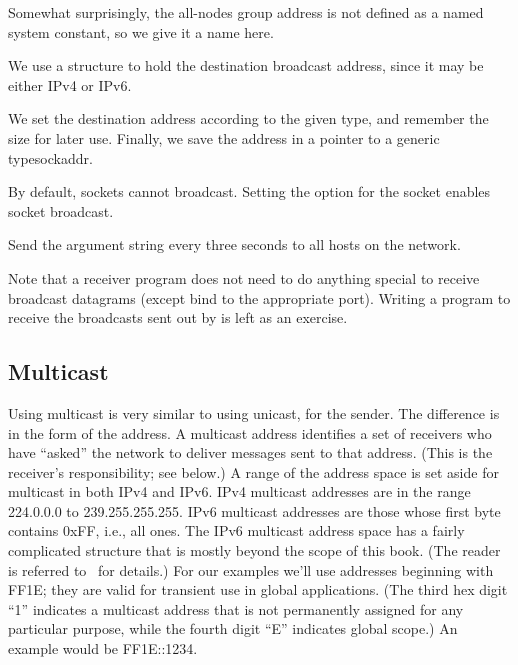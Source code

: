 \begin{topcode}


Somewhat surprisingly, the all-nodes group address is not defined as a
named system constant, so we give it a name here.



We use a  structure to hold the destination
broadcast address, since it may be either IPv4 or IPv6.


We set the destination address according to the given type, and
remember the size for later use.  Finally, we save the address in a
pointer to a generic type{sockaddr}.


By default, sockets cannot broadcast.  Setting the
 option
for the socket enables socket broadcast.

Send the argument string every three seconds to all hosts on the network.
\end{topcode}

Note that a receiver program does not need to do anything special to
receive broadcast datagrams (except bind to the appropriate port).
Writing a program to receive the broadcasts sent out by
 is left as an exercise.

\subsection{Multicast}

Using multicast is very similar to using unicast, for the sender.
The difference is in the form of the address.
A multicast address identifies a set of receivers who have ``asked''
the network to deliver messages sent to that address.  (This is the
receiver's responsibility; see below.)
A range of the address space is set aside for multicast in both IPv4
and IPv6.  IPv4 multicast addresses are in the range
224.0.0.0 to 239.255.255.255.  IPv6 multicast addresses are those
whose first byte contains 0xFF, i.e., all ones.  The IPv6 multicast
address space has a fairly complicated structure that is mostly beyond
the scope of this book. (The reader is referred to~\cite{RFC4291} for
details.)  For our examples we'll use
addresses beginning with FF1E; they are valid for transient use in global
applications.
(The third hex digit ``1'' indicates a multicast address that
is not permanently assigned for any particular purpose, while the
fourth digit ``E'' indicates global scope.)  An example would be FF1E::1234.

